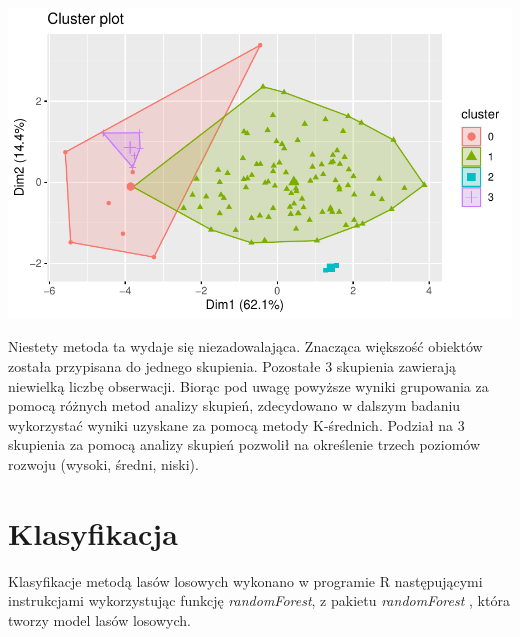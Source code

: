 \documentclass{amuthesis}
\begin{document}
\begin{center}\includegraphics[width=1\linewidth]{figures/unnamed-chunk-17-1} \end{center}

Niestety metoda ta wydaje się niezadowalająca. Znacząca większość obiektów została przypisana do jednego skupienia. Pozostałe 3 skupienia zawierają niewielką liczbę obserwacji.
Biorąc pod uwagę powyższe wyniki grupowania za pomocą różnych metod analizy skupień, zdecydowano w dalszym badaniu wykorzystać wyniki uzyskane za pomocą metody K-średnich.
Podział na 3 skupienia za pomocą analizy skupień pozwolił na określenie trzech poziomów rozwoju (wysoki, średni, niski).

\hypertarget{kla_ad}{%
\section{Klasyfikacja}\label{kla_ad}}

Klasyfikacje metodą lasów losowych wykonano w programie R następującymi instrukcjami wykorzystując funkcję \emph{randomForest}, z pakietu \emph{randomForest} \autocite{R-randomForest}, która tworzy model lasów losowych.

\begin{Shaded}
\begin{Highlighting}[]
\OtherTok{\textless{}{-}}\SpecialCharTok{::}\NormalTok{(}\SpecialCharTok{\textasciitilde{}}
 \NormalTok{, } \NormalTok{, } \NormalTok{)}
\end{Highlighting}
\end{Shaded}
\end{document}
